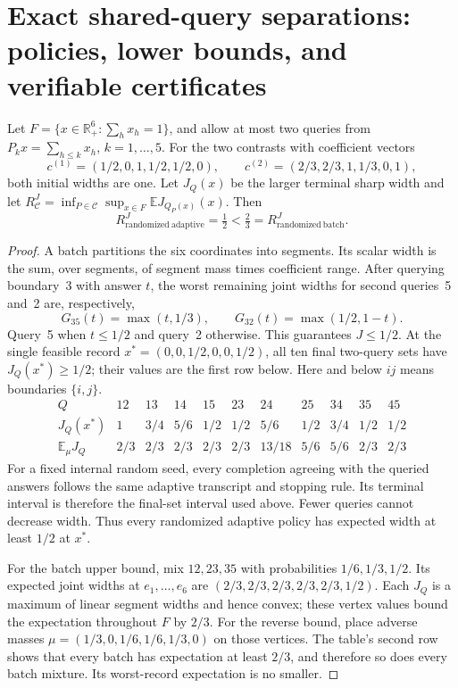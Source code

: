 \section{Exact shared-query separations: policies, lower bounds, and verifiable certificates}
\label{sec:joint-separations}
\begin{theorem}
\label{thm:shared-prefix-separation}
Let $F=\{x\in\mathbb R_+^6:\sum_hx_h=1\}$, and allow at most two
queries from $P_kx=\sum_{h\leq k}x_h$, $k=1,\ldots,5$.  For the two
contrasts with coefficient vectors
\[
 c^{(1)}=(1/2,0,1,1/2,1/2,0),\qquad
 c^{(2)}=(2/3,2/3,1,1/3,0,1),
\]
both initial widths are one.  Let $J_Q(x)$ be the larger terminal sharp
width and let $R^J_{\mathcal C}=\inf_{P\in\mathcal C}\sup_{x\in F}
\mathbb E J_{Q_P(x)}(x)$.  Then
\[
 R^J_{\mathrm{randomized\ adaptive}}=\tfrac12
 <\tfrac23=R^J_{\mathrm{randomized\ batch}}.
\]
\end{theorem}
\begin{proof}
A batch partitions the six coordinates into segments.  Its scalar width
is the sum, over segments, of segment mass times coefficient range.
After querying boundary~3 with answer $t$, the worst remaining joint
widths for second queries~5 and~2 are, respectively,
\[
 G_{35}(t)=\max(t,1/3),\qquad
 G_{32}(t)=\max(1/2,1-t).
\]
Query~5 when $t\leq1/2$ and query~2 otherwise.  This guarantees $J\leq1/2$.
At the single feasible record $x^*=(0,0,1/2,0,0,1/2)$, all ten final
two-query sets have $J_Q(x^*)\geq1/2$; their values are the first row below.
Here and below $ij$ means boundaries $\{i,j\}$.
\[
\begin{array}{c|cccccccccc}
Q&12&13&14&15&23&24&25&34&35&45\\\hline
J_Q(x^*)&1&3/4&5/6&1/2&1/2&5/6&1/2&3/4&1/2&1/2\\
\mathbb E_\mu J_Q&2/3&2/3&2/3&2/3&2/3&13/18&5/6&5/6&2/3&2/3
\end{array}
\]
For a fixed internal random seed, every completion agreeing with the
queried answers follows the same adaptive transcript and stopping rule.
Its terminal interval is therefore the final-set interval used above.
Fewer queries cannot decrease width.  Thus every randomized adaptive
policy has expected width at least $1/2$ at $x^*$.

For the batch upper bound, mix $12,23,35$ with probabilities
$1/6,1/3,1/2$.  Its expected joint widths at $e_1,\ldots,e_6$ are
$(2/3,2/3,2/3,2/3,2/3,1/2)$.  Each $J_Q$ is a maximum of linear segment
widths and hence convex; these vertex values bound the expectation
throughout $F$ by $2/3$.  For the reverse bound, place adverse masses
$\mu=(1/3,0,1/6,1/6,1/3,0)$ on those vertices.  The table's second row
shows that every batch has expectation at least $2/3$, and therefore so
does every batch mixture.  Its worst-record expectation is no smaller.
\end{proof}
